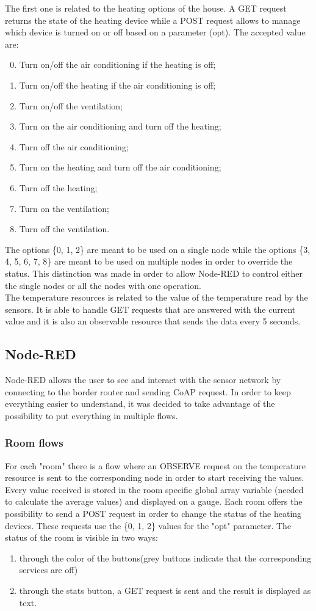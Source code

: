 The first one is related to the heating options of the house. A GET request returns the state of the heating device while a POST request allows to manage which device is turned on or off based on a parameter (opt). The accepted value are:
\begin{enumerate}
\setcounter{enumi}{-1}
	\item Turn on/off the air conditioning if the heating is off;
	\item Turn on/off the heating if the air conditioning is off;
	\item Turn on/off the ventilation;
	\item Turn on the air conditioning and turn off the heating;
	\item Turn off the air conditioning;
	\item Turn on the heating and turn off the air conditioning;
	\item Turn off the heating;
	\item Turn on the ventilation;
	\item Turn off the ventilation.
\end{enumerate}
The options \{0, 1, 2\} are meant to be used on a single node while the options \{3, 4, 5, 6, 7, 8\} are meant to be used on multiple nodes in order to override the status. This distinction was made in order to allow Node-RED to control either the single nodes or all the nodes with one operation.\\
The temperature resources is related to the value of the temperature read by the sensors. It is able to handle GET requests that are answered with the current value and it is also an observable resource that sends the data every 5 seconds.

\subsection*{Node-RED}
Node-RED allows the user to see and interact with the sensor network by connecting to the border router and sending CoAP request. In order to keep everything easier to understand, it was decided to take advantage of the possibility to put everything in multiple flows.
\subsubsection*{Room flows}
For each "room" there is a flow where an OBSERVE request on the temperature resource is sent to the corresponding node in order to start receiving the values. Every value received is  stored in the room specific global array variable (needed to calculate the average values) and displayed on a gauge. Each room offers the possibility to  send a POST request in order to change the status of the heating devices. These requests use the \{0, 1, 2\} values for the "opt" parameter. 
The status of the room is visible in two ways:
\begin{enumerate}
	\setcounter{enumi}{0}
	\item through the color of the buttons(grey buttons indicate that the corresponding services are off)
	\item through the stats button, a GET request is sent and the result is displayed as text.
\end{enumerate}

